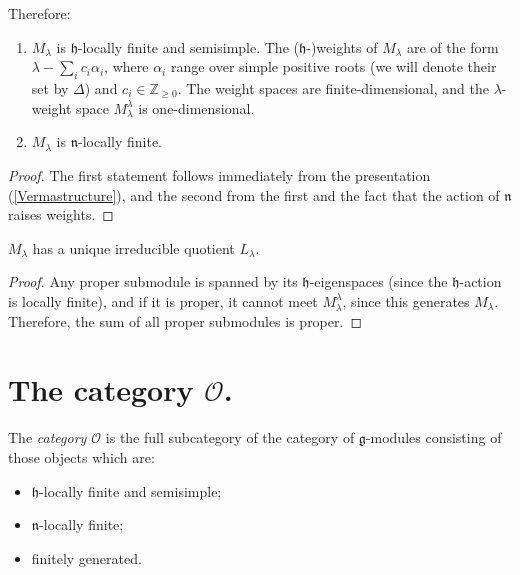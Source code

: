 Therefore:
\begin{lemma}
\label{lemma-properties-Verma}
 \begin{enumerate}
  \item $M_\lambda$ is $\mathfrak h$-locally finite and semisimple. The ($\mathfrak h$-)weights of $M_\lambda$ are of the form $\lambda - \sum_i c_i\alpha_i$, where $\alpha_i$ range over simple positive roots (we will denote their set by $\Delta$) and $c_i\in \mathbb Z_{\ge 0}$. The weight spaces are finite-dimensional, and the $\lambda$-weight space $M_\lambda^\lambda$ is one-dimensional.
 \item $M_\lambda$ is $\mathfrak n$-locally finite.
 \end{enumerate}
\end{lemma}

\begin{proof}
 The first statement follows immediately from the presentation (\ref{Vermastructure}), and the second from the first and the fact that the action of $\mathfrak n$ raises weights.
\end{proof}

\begin{proposition}
\label{proposition-uniquequotient}
 $M_\lambda$ has a unique irreducible quotient $L_\lambda$. 
\end{proposition}

\begin{proof}
Any proper submodule is spanned by its $\mathfrak h$-eigenspaces (since the $\mathfrak h$-action is locally finite), and 
 if it is proper, it cannot meet $M_\lambda^\lambda$, since this generates $M_\lambda$. Therefore, the sum of all proper submodules is proper.
\end{proof}




\section{The category $\mathcal O$.}
\label{section-category-O}

\begin{definition}
 \label{definition-category-O}
The {\it category $\mathcal O$} is the full subcategory of the category of $\mathfrak g$-modules consisting of those objects which are:
\begin{itemize}
 \item $\mathfrak h$-locally finite and semisimple;
 \item $\mathfrak n$-locally finite;
 \item finitely generated.
\end{itemize}
\end{definition}

